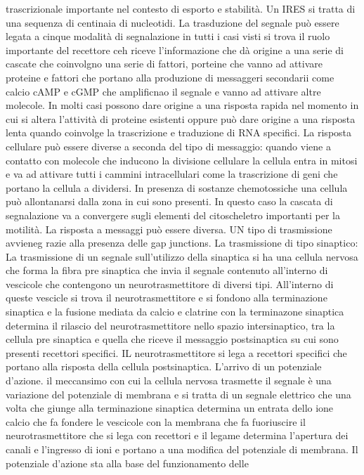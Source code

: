 trascrizionale importante nel contesto di esporto e stabilit\`a. Un IRES si tratta di una sequenza di centinaia di nucleotidi. La trasduzione del segnale pu\`o essere legata a cinque
modalit\`a di segnalazione in tutti i casi visti si trova il ruolo importante del recettore ceh riceve l'informazione che d\`a origine a una serie di cascate che coinvolgno una serie di
fattori, porteine che vanno ad attivare proteine e fattori che portano alla produzione di messaggeri secondarii come calcio cAMP e cGMP che amplificnao il segnale e vanno ad attivare
altre molecole. In molti casi possono dare origine a una risposta rapida nel momento in cui si altera l'attivit\`a di proteine esistenti oppure pu\`o dare origine a una risposta lenta
quando coinvolge la trascrizione e traduzione di RNA specifici. La risposta cellulare pu\`o essere diverse a seconda del tipo di messaggio: quando viene a contatto con molecole che 
inducono la divisione cellulare la cellula entra in mitosi e va ad attivare tutti i cammini intracellulari come la trascrizione di geni che portano la cellula a dividersi. In presenza
di sostanze chemotossiche una cellula pu\`o allontanarsi dalla zona in cui sono presenti. In questo caso la cascata di segnalazione va a convergere sugli elementi del citoscheletro 
importanti per la motilit\`a. La risposta a messaggi pu\`o essere diversa. UN tipo di trasmissione avvieneg razie alla presenza delle gap junctions. La trasmissione di tipo sinaptico:
La trasmissione di un segnale sull'utilizzo della sinaptica si ha una cellula nervosa che forma la fibra pre sinaptica che invia il segnale contenuto all'interno di vescicole che 
contengono un neurotrasmettitore di diversi tipi. All'interno di queste vescicle si trova il neurotrasmettitore e si fondono alla terminazione sinaptica e la fusione mediata da 
calcio e clatrine con la terminazone sinaptica determina il rilascio del neurotrasmettitore nello spazio intersinaptico, tra la cellula pre sinaptica e quella che riceve il messaggio 
postsinaptica su cui sono presenti recettori specifici. IL neurotrasmettitore si lega a recettori specifici che portano alla risposta della cellula postsinaptica. L'arrivo di un 
potenziale d'azione. il meccansimo con cui la cellula nervosa trasmette il segnale \`e una variazione del potenziale di membrana e si tratta di un segnale elettrico che una volta che
giunge alla terminazione sinaptica determina un entrata dello ione calcio che fa fondere le vescicole con la membrana che fa fuoriuscire il neurotrasmettitore che si lega con recettori
e il legame determina l'apertura dei canali e l'ingresso di ioni e portano a una modifica del potenziale di membrana. Il potenziale d'azione sta alla base del funzionamento delle 
